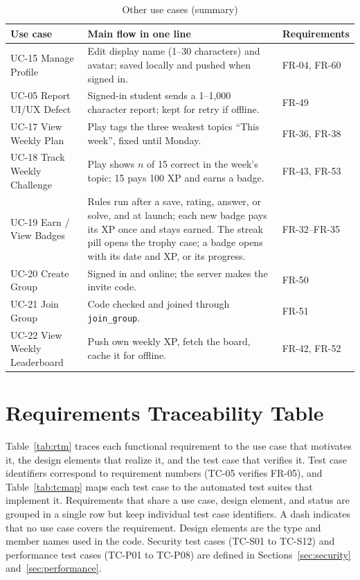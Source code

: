 \documentclass[12pt,letterpaper]{article}
\begin{document}
\begin{table}[H]
\centering
\caption{Other use cases (summary)}
\label{tab:ucnew}
\begin{tabularx}{\textwidth}{@{}L{3.6cm} Y L{2.0cm}@{}}
\toprule
\textbf{Use case} & \textbf{Main flow in one line} & \textbf{Requirements} \\
\midrule
UC-15 Manage Profile & Edit display name (1--30 characters) and avatar; saved locally and pushed when signed in. & FR-04, FR-60 \\
UC-05 Report UI/UX Defect & Signed-in student sends a 1--1,000 character report; kept for retry if offline. & FR-49 \\
UC-17 View Weekly Plan & Play tags the three weakest topics ``This week'', fixed until Monday. & FR-36, FR-38 \\
UC-18 Track Weekly Challenge & Play shows $n$ of 15 correct in the week's topic; 15 pays 100 XP and earns a badge. & FR-43, FR-53 \\
UC-19 Earn / View Badges & Rules run after a save, rating, answer, or solve, and at launch; each new badge pays its XP once and stays earned. The streak pill opens the trophy case; a badge opens with its date and XP, or its progress. & FR-32--FR-35 \\
UC-20 Create Group & Signed in and online; the server makes the invite code. & FR-50 \\
UC-21 Join Group & Code checked and joined through \texttt{join\_group}. & FR-51 \\
UC-22 View Weekly Leaderboard & Push own weekly XP, fetch the board, cache it for offline. & FR-42, FR-52 \\
\bottomrule
\end{tabularx}
\end{table}

\section{Requirements Traceability Table}\label{sec:trace}

Table~\ref{tab:rtm} traces each functional requirement to the use case that motivates
it, the design elements that realize it, and the test case that verifies it. Test case
identifiers correspond to requirement numbers (TC-05 verifies FR-05), and
Table~\ref{tab:tcmap} maps each test case to the automated test suites that implement
it. Requirements that share a use case, design element, and status are grouped in a
single row but keep individual test case identifiers. A dash indicates that no use case
covers the requirement. Design elements are the type and member names used in the code.
Security test cases (TC-S01 to TC-S12) and performance test cases (TC-P01 to TC-P08)
are defined in Sections~\ref{sec:security} and~\ref{sec:performance}.
\end{document}
